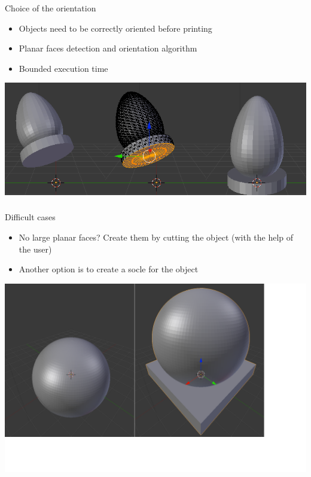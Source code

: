 \documentclass{beamer}
\begin{document}
\begin{frame}
	\begin{block}{Choice of the orientation}
		\begin{itemize}
			\item Objects need to be correctly oriented before printing
			\item Planar faces detection and orientation algorithm
			\item Bounded execution time
		\end{itemize}
    \end{block}

	\begin{center}
		\includegraphics[width=\textwidth]{pf_detect}
	\end{center}
\end{frame}

\begin{frame}
    \frametitle{}
	\begin{block}{Difficult cases}
		\begin{itemize}
			\item No large planar faces? Create them by cutting the object (with the help of the user)
			\item Another option is to create a socle for the object
		\end{itemize}
    \end{block}

	\begin{center}
		\includegraphics[width=.7\textwidth]{pf_socle}
	\end{center}
    
\end{frame}
\end{document}
